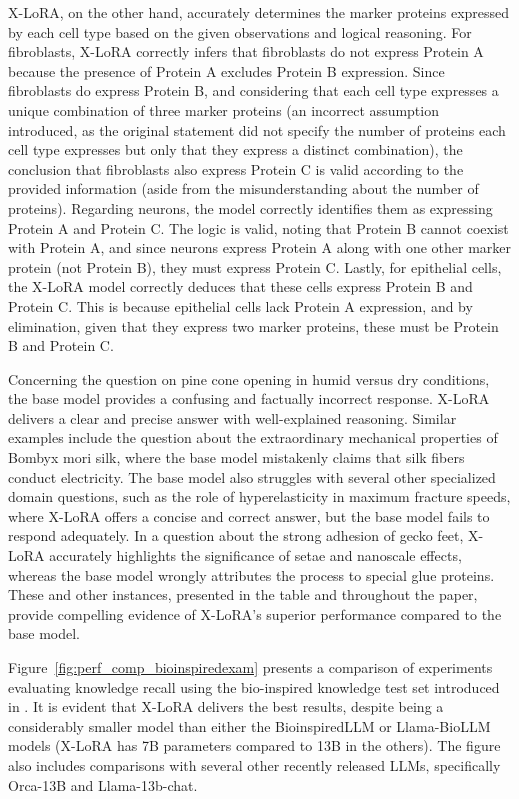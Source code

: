 X-LoRA, on the other hand, accurately determines the marker proteins expressed by each cell type based on the given observations and logical reasoning. For fibroblasts, X-LoRA correctly infers that fibroblasts do not express Protein A because the presence of Protein A excludes Protein B expression. Since fibroblasts do express Protein B, and considering that each cell type expresses a unique combination of three marker proteins (an incorrect assumption introduced, as the original statement did not specify the number of proteins each cell type expresses but only that they express a distinct combination), the conclusion that fibroblasts also express Protein C is valid according to the provided information (aside from the misunderstanding about the number of proteins). Regarding neurons, the model correctly identifies them as expressing Protein A and Protein C. The logic is valid, noting that Protein B cannot coexist with Protein A, and since neurons express Protein A along with one other marker protein (not Protein B), they must express Protein C. Lastly, for epithelial cells, the X-LoRA model correctly deduces that these cells express Protein B and Protein C. This is because epithelial cells lack Protein A expression, and by elimination, given that they express two marker proteins, these must be Protein B and Protein C.

Concerning the question on pine cone opening in humid versus dry conditions, the base model provides a confusing and factually incorrect response. X-LoRA delivers a clear and precise answer with well-explained reasoning. Similar examples include the question about the extraordinary mechanical properties of Bombyx mori silk, where the base model mistakenly claims that silk fibers conduct electricity. The base model also struggles with several other specialized domain questions, such as the role of hyperelasticity in maximum fracture speeds, where X-LoRA offers a concise and correct answer, but the base model fails to respond adequately. In a question about the strong adhesion of gecko feet, X-LoRA accurately highlights the significance of setae and nanoscale effects, whereas the base model wrongly attributes the process to special glue proteins. These and other instances, presented in the table and throughout the paper, provide compelling evidence of X-LoRA's superior performance compared to the base model.

Figure~\ref{fig:perf_comp_bioinspiredexam} presents a comparison of experiments evaluating knowledge recall using the bio-inspired knowledge test set introduced in \cite{Luu2023BioinspiredLLM:Materials}. It is evident that X-LoRA delivers the best results, despite being a considerably smaller model than either the BioinspiredLLM or Llama-BioLLM models (X-LoRA has 7B parameters compared to 13B in the others). The figure also includes comparisons with several other recently released LLMs, specifically Orca-13B and Llama-13b-chat.

